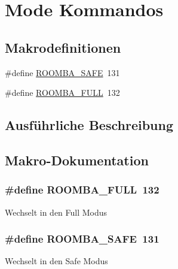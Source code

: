 \hypertarget{group__roomba__command__mode}{\section{Mode Kommandos}
\label{group__roomba__command__mode}
}
\subsection*{Makrodefinitionen}
\begin{DoxyCompactItemize}
\item 
\#define \hyperlink{group__roomba__command__mode_ga58b7e7ff9b7fd032d5399403fbfe4ed1}{R\-O\-O\-M\-B\-A\-\_\-\-S\-A\-F\-E}~131
\item 
\#define \hyperlink{group__roomba__command__mode_ga3d2cc8c07888194269d59f884677a7f7}{R\-O\-O\-M\-B\-A\-\_\-\-F\-U\-L\-L}~132
\end{DoxyCompactItemize}


\subsection{Ausführliche Beschreibung}


\subsection{Makro-\/\-Dokumentation}
\hypertarget{group__roomba__command__mode_ga3d2cc8c07888194269d59f884677a7f7}{
\subsubsection[{R\-O\-O\-M\-B\-A\-\_\-\-F\-U\-L\-L}]{\setlength{\rightskip}{0pt plus 5cm}\#define R\-O\-O\-M\-B\-A\-\_\-\-F\-U\-L\-L~132}}\label{group__roomba__command__mode_ga3d2cc8c07888194269d59f884677a7f7}
Wechselt in den Full Modus \hypertarget{group__roomba__command__mode_ga58b7e7ff9b7fd032d5399403fbfe4ed1}{
\subsubsection[{R\-O\-O\-M\-B\-A\-\_\-\-S\-A\-F\-E}]{\setlength{\rightskip}{0pt plus 5cm}\#define R\-O\-O\-M\-B\-A\-\_\-\-S\-A\-F\-E~131}}\label{group__roomba__command__mode_ga58b7e7ff9b7fd032d5399403fbfe4ed1}
Wechselt in den Safe Modus 